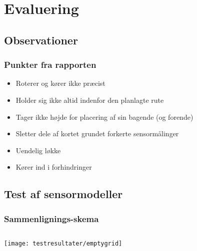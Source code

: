 \section{Evaluering}

\subsection{Observationer}

\begin{frame}
\frametitle{Punkter fra rapporten}
\begin{itemize}
\item Roterer og kører ikke præcist
\item Holder sig ikke altid indenfor den planlagte rute
\item Tager ikke højde for placering af sin bagende (og forende)
\item Sletter dele af kortet grundet forkerte sensormålinger
\item Uendelig løkke
\item Kører ind i forhindringer
\end{itemize}
\end{frame}

\subsection{Test af sensormodeller}
\begin{frame}
\frametitle{Sammenlignings-skema}
\begin{columns}
\begin{column}{.59\textwidth}
\begin{center}
\texttt{[image: testresultater/emptygrid]}\\

\end{center}
\end{column}
\begin{column}{.40\textwidth}
\\
\end{column}
\end{columns}
\end{frame}

